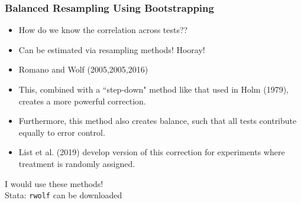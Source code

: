 
\begin{frame}
\frametitle{Balanced Resampling Using Bootstrapping}
\begin{itemize}
    \item How do we know the correlation across tests??
    \item Can be estimated via resampling methods! Hooray!
    \item Romano and Wolf (2005,2005,2016)
    \item This, combined with a ``step-down" method like that used in Holm (1979), creates a more powerful correction.
    \item Furthermore, this method also creates balance, such that all tests contribute equally to error control.
    \item List et al. (2019) develop version of this correction for experiments where treatment is randomly assigned.
\end{itemize}
\br 
I would use these methods!\\
Stata: \texttt{rwolf} can be downloaded
\end{frame}





